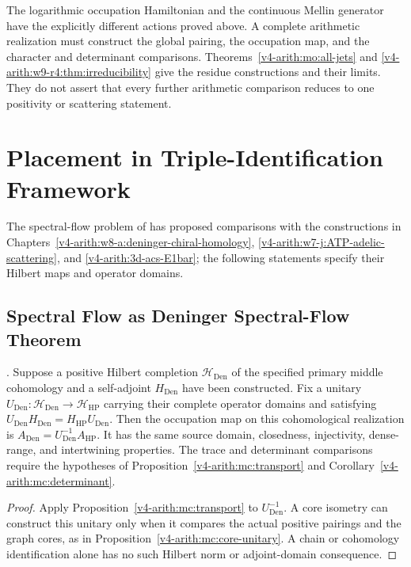 \begin{remark}
\label{v4-arith:w9-r4:rem:beilinson-closure}
The logarithmic occupation Hamiltonian and the continuous Mellin
generator have the explicitly different actions proved above.
A complete arithmetic realization must construct the global pairing,
the occupation map, and the character and determinant comparisons.
Theorems~\ref{v4-arith:mo:all-jets} and
\ref{v4-arith:w9-r4:thm:irreducibility} give the residue constructions
and their limits. They do not assert that every further arithmetic
comparison reduces to one positivity or scattering statement.
\end{remark}

\section{Placement in Triple-Identification Framework}
\label{v4-arith:w9-r4:placement}

The spectral-flow problem of 
has proposed comparisons with the constructions in
Chapters~\ref{v4-arith:w8-a:deninger-chiral-homology},
\ref{v4-arith:w7-j:ATP-adelic-scattering}, and
\ref{v4-arith:3d-acs-E1bar}; the following statements specify their Hilbert maps and
operator domains.

\subsection{Spectral Flow as Deninger Spectral-Flow Theorem}
\label{v4-arith:w9-r4:placement:deninger}

\begin{proposition}
\label{v4-arith:w9-r4:prop:spectral-flow-eq-deninger}
\ClaimStatusProvedHereConditional. Suppose a positive Hilbert completion
$\mathcal H_{\mathrm{Den}}$ of the specified primary middle cohomology
and a self-adjoint $H_{\mathrm{Den}}$ have been constructed.
Fix a unitary $U_{\mathrm{Den}}:\mathcal H_{\mathrm{Den}}
\to\mathcal H_{\mathrm{HP}}$ carrying their complete operator domains
and satisfying $U_{\mathrm{Den}}H_{\mathrm{Den}}
=H_{\mathrm{HP}}U_{\mathrm{Den}}$.
Then the occupation map on this cohomological realization is
$A_{\mathrm{Den}}=U_{\mathrm{Den}}^{-1}A_{\mathrm{HP}}$.
It has the same source domain, closedness, injectivity, dense-range,
and intertwining properties. The trace and determinant comparisons
require the hypotheses of Proposition~\ref{v4-arith:mc:transport}
and Corollary~\ref{v4-arith:mc:determinant}.
\end{proposition}
\begin{proof}
Apply Proposition~\ref{v4-arith:mc:transport} to
$U_{\mathrm{Den}}^{-1}$. A core isometry can construct this unitary
only when it compares the actual positive pairings and the graph
cores, as in Proposition~\ref{v4-arith:mc:core-unitary}.
A chain or cohomology identification alone has no such Hilbert
norm or adjoint-domain consequence.
\end{proof}

